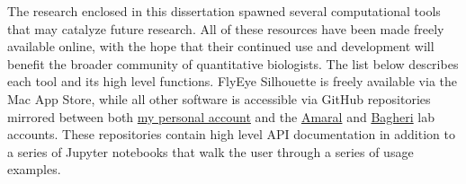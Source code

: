 The research enclosed in this dissertation spawned several computational tools that may catalyze future research. All of these resources have been made freely available online, with the hope that their continued use and development will benefit the broader community of quantitative biologists. The list below describes each tool and its high level functions. FlyEye Silhouette is freely available via the Mac App Store, while all other software is accessible via GitHub repositories mirrored between both \href{https://github.com/sebastianbernasek/}{my personal account} and the \href{https://github.com/amarallab}{Amaral} and \href{https://github.com/bagherilab}{Bagheri} lab accounts. These repositories contain high level API documentation in addition to a series of Jupyter notebooks that walk the user through a series of usage examples. 

